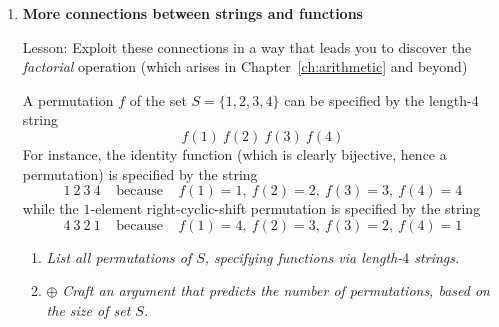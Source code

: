 {\begin{enumerate}
\begin{enumerate}
  \medskip\item
{\em Prove that $h(x)$ is a {\em surjection} from $\N^+$ to $\N^+$.}

  \medskip\item
{\em Prove that the preceding assertions are as strong as possible, in the sense that:}
    \begin{enumerate}
    \item
{\em Neither $f(x)$ nor $g(x)$ is a {\em surjection} from $\N^+$ to $\N^+$.}
    \medskip\item
{\em $h(x)$ is not an {\em injection} from $\N^+$ to $\N^+$.}
    \end{enumerate}
      
  \medskip\item {}
{\em Prove that $h(x)$ is a ``post-inverse" to both $f(x)$ and $g(x)$, in the sense that applying $h$ ``undoes" an earlier application of either $f$ or $g$.  In detail, for all $x \in \N^+$:
\[ h(f(x)) \ \ = \ \ h(g(x)) \ \ = \ \ x \]
In other words, both $f \circ h$ and $g \circ h$ are the identity function on $\N^+$. }
  \end{enumerate}

\medskip\item
{\bf More connections between strings and functions}

{\sc Lesson:} Exploit these connections in a way that leads you to discover the {\em factorial} operation (which arises in Chapter~\ref{ch:arithmetic} and beyond)

\smallskip

A permutation $f$ of the set $S = \{1,2,3,4\}$ can be specified by the length-$4$ string
\[ f(1) \ f(2) \ f(3) \ f(4) \]
For instance, the identity function (which is clearly bijective, hence a permutation) is specified by the string
\[ 1 \ 2 \ 3 \ 4 \ \ \ \ \ \mbox{because} \ \ \ \ \ f(1)=1, \ f(2)=2, \ f(3) =3, \ f(4)=4 \]
while the $1$-element right-cyclic-shift permutation is specified by the string
\[ 4 \ 3 \ 2 \ 1 \ \ \ \ \ \mbox{because} \ \ \ \ \ f(1)=4, \ f(2)=3, \ f(3) =2, \ f(4)=1\]
  \begin{enumerate}
  \item
{\em List all permutations of $S$, specifying functions via length-$4$ strings.}
  \medskip\item
$\oplus$
{\em Craft an argument that predicts the number of permutations, based on the size of set $S$.}

\smallskip


\end{enumerate}
\end{enumerate}}
